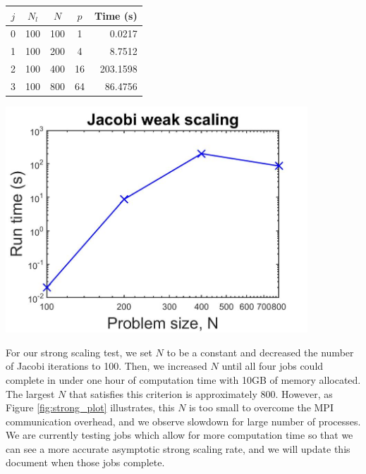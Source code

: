\begin{questions}
\begin{solution}
    \begin{minipage}{0.48\textwidth}
    \begin{center}
        \begin{tabular}{|c|c|c|c|r|}
        \hline
        $j$ & $N_l$ & $N$ & $p$ & Time (s) \\
        \hline\hline
        0 & 100 & 100 & 1 & 0.0217 \\ 
        \hline
        1 & 100 & 200 & 4 & 8.7512 \\ 
        \hline
        2 & 100 & 400 & 16 & 203.1598 \\ 
        \hline
        3 & 100 & 800 & 64 & 86.4756 \\ 
        \hline
        \end{tabular}
        \label{tab:weak_jacobi}
    \end{center}
    \end{minipage}
    \begin{minipage}{0.48\textwidth}
    \begin{center}
        \includegraphics[width=0.85\textwidth]{Images/jacobi_weak_plot.jpg}
        \label{fig:weak_plot}
    \end{center}
    \end{minipage}
    
    For our strong scaling test, we set $N$ to be a constant and decreased the 
    number of Jacobi iterations to 100. Then, we increased $N$ until all four
    jobs could complete in under one hour of computation time with 10GB of
    memory allocated. The largest $N$ that satisfies this criterion is 
    approximately 800. However, as Figure \ref{fig:strong_plot} illustrates,
    this $N$ is too small to overcome the MPI communication overhead, and we
    observe slowdown for large number of processes. We are currently testing
    jobs which allow for more computation time so that we can see a more
    accurate asymptotic strong scaling rate, and we will update this document
    when those jobs complete.
    

\end{solution}
\end{questions}
